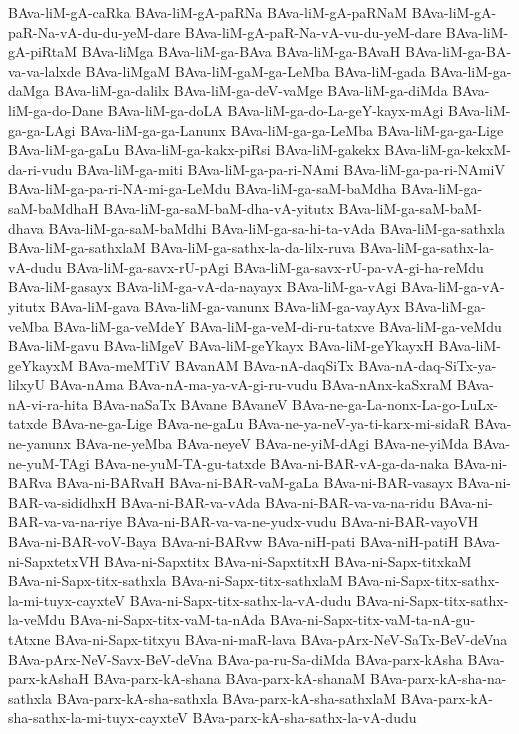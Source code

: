 {BAva-liM-gA-caRka
BAva-liM-gA-paRNa
BAva-liM-gA-paRNaM
BAva-liM-gA-paR-Na-vA-du-du-yeM-dare
BAva-liM-gA-paR-Na-vA-vu-du-yeM-dare
BAva-liM-gA-piRtaM
BAva-liMga
BAva-liM-ga-BAva
BAva-liM-ga-BAvaH
BAva-liM-ga-BA-va-va-lalxde
BAva-liMgaM
BAva-liM-gaM-ga-LeMba
BAva-liM-gada
BAva-liM-ga-daMga
BAva-liM-ga-dalilx
BAva-liM-ga-deV-vaMge
BAva-liM-ga-diMda
BAva-liM-ga-do-Dane
BAva-liM-ga-doLA
BAva-liM-ga-do-La-geY-kayx-mAgi
BAva-liM-ga-ga-LAgi
BAva-liM-ga-ga-Lanunx
BAva-liM-ga-ga-LeMba
BAva-liM-ga-ga-Lige
BAva-liM-ga-gaLu
BAva-liM-ga-kakx-piRsi
BAva-liM-gakekx
BAva-liM-ga-kekxM-da-ri-vudu
BAva-liM-ga-miti
BAva-liM-ga-pa-ri-NAmi
BAva-liM-ga-pa-ri-NAmiV
BAva-liM-ga-pa-ri-NA-mi-ga-LeMdu
BAva-liM-ga-saM-baMdha
BAva-liM-ga-saM-baMdhaH
BAva-liM-ga-saM-baM-dha-vA-yitutx
BAva-liM-ga-saM-baM-dhava
BAva-liM-ga-saM-baMdhi
BAva-liM-ga-sa-hi-ta-vAda
BAva-liM-ga-sathxla
BAva-liM-ga-sathxlaM
BAva-liM-ga-sathx-la-da-lilx-ruva
BAva-liM-ga-sathx-la-vA-dudu
BAva-liM-ga-savx-rU-pAgi
BAva-liM-ga-savx-rU-pa-vA-gi-ha-reMdu
BAva-liM-gasayx
BAva-liM-ga-vA-da-nayayx
BAva-liM-ga-vAgi
BAva-liM-ga-vA-yitutx
BAva-liM-gava
BAva-liM-ga-vanunx
BAva-liM-ga-vayAyx
BAva-liM-ga-veMba
BAva-liM-ga-veMdeY
BAva-liM-ga-veM-di-ru-tatxve
BAva-liM-ga-veMdu
BAva-liM-gavu
BAva-liMgeV
BAva-liM-geYkayx
BAva-liM-geYkayxH
BAva-liM-geYkayxM
BAva-meMTiV
BAvanAM
BAva-nA-daqSiTx
BAva-nA-daq-SiTx-ya-lilxyU
BAva-nAma
BAva-nA-ma-ya-vA-gi-ru-vudu
BAva-nAnx-kaSxraM
BAva-nA-vi-ra-hita
BAva-naSaTx
BAvane
BAvaneV
BAva-ne-ga-La-nonx-La-go-LuLx-tatxde
BAva-ne-ga-Lige
BAva-ne-gaLu
BAva-ne-ya-neV-ya-ti-karx-mi-sidaR
BAva-ne-yanunx
BAva-ne-yeMba
BAva-neyeV
BAva-ne-yiM-dAgi
BAva-ne-yiMda
BAva-ne-yuM-TAgi
BAva-ne-yuM-TA-gu-tatxde
BAva-ni-BAR-vA-ga-da-naka
BAva-ni-BARva
BAva-ni-BARvaH
BAva-ni-BAR-vaM-gaLa
BAva-ni-BAR-vasayx
BAva-ni-BAR-va-sididhxH
BAva-ni-BAR-va-vAda
BAva-ni-BAR-va-va-na-ridu
BAva-ni-BAR-va-va-na-riye
BAva-ni-BAR-va-va-ne-yudx-vudu
BAva-ni-BAR-vayoVH
BAva-ni-BAR-voV-Baya
BAva-ni-BARvw
BAva-niH-pati
BAva-niH-patiH
BAva-ni-SapxtetxVH
BAva-ni-Sapxtitx
BAva-ni-SapxtitxH
BAva-ni-Sapx-titxkaM
BAva-ni-Sapx-titx-sathxla
BAva-ni-Sapx-titx-sathxlaM
BAva-ni-Sapx-titx-sathx-la-mi-tuyx-cayxteV
BAva-ni-Sapx-titx-sathx-la-vA-dudu
BAva-ni-Sapx-titx-sathx-la-veMdu
BAva-ni-Sapx-titx-vaM-ta-nAda
BAva-ni-Sapx-titx-vaM-ta-nA-gu-tAtxne
BAva-ni-Sapx-titxyu
BAva-ni-maR-lava
BAva-pArx-NeV-SaTx-BeV-deVna
BAva-pArx-NeV-Savx-BeV-deVna
BAva-pa-ru-Sa-diMda
BAva-parx-kAsha
BAva-parx-kAshaH
BAva-parx-kA-shana
BAva-parx-kA-shanaM
BAva-parx-kA-sha-na-sathxla
BAva-parx-kA-sha-sathxla
BAva-parx-kA-sha-sathxlaM
BAva-parx-kA-sha-sathx-la-mi-tuyx-cayxteV
BAva-parx-kA-sha-sathx-la-vA-dudu
}
